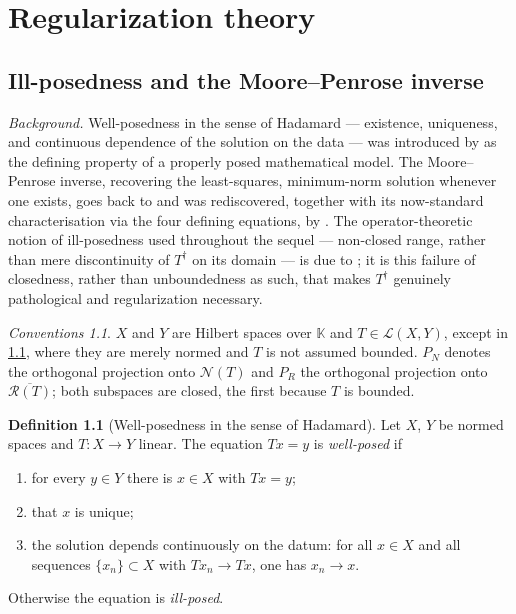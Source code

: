 \documentclass[a4paper]{report}
\theoremstyle{plain}
\theoremstyle{definition}
\newtheorem{definition}[theorem]{Definition}
\theoremstyle{remark}
\newtheorem{assumptions}[theorem]{Conventions}
\newcommand{\Ll}{\mathcal{L}}
\newcommand{\Ran}{\mathcal{R}}
\newcommand{\Ker}{\mathcal{N}}
\newcommand{\dg}{^{\dagger}}
\begin{document}
 \part{Regularization theory}
\label{part_2_reg}

\chapter{Ill-posedness and the Moore--Penrose inverse}
\label{ch_11_moore_penrose}

\noindent\emph{Background.} Well-posedness in the sense of Hadamard --- existence,
uniqueness, and continuous dependence of the solution on the data --- was introduced by
\citet{Hadamard1902} as the defining property of a properly posed mathematical model. The
Moore--Penrose inverse, recovering the least-squares, minimum-norm solution whenever one
exists, goes back to \citet{Moore1920} and was rediscovered, together with its
now-standard characterisation via the four defining equations, by \citet{Penrose1955}.
The operator-theoretic notion of ill-posedness used throughout the sequel --- non-closed
range, rather than mere discontinuity of $T\dg$ on its domain --- is due to
\citet{Nashed1987}; it is this failure of closedness, rather than unboundedness as such,
that makes $T\dg$ genuinely pathological and regularization necessary.

\begin{assumptions}
  \label{asm_ill_posedness_moore}
  $X$ and $Y$ are Hilbert spaces over $\mathbb{K}$ and
$T \in \Ll(X,Y)$, except in \cref{def_well_posed}, where they are merely normed and $T$
is not assumed bounded.  $P_N$ denotes the orthogonal projection
onto $\Ker(T)$ and $P_R$ the orthogonal projection onto $\overline{\Ran(T)}$; both
subspaces are closed, the first because $T$ is bounded.
\end{assumptions}

\begin{definition}[Well-posedness in the sense of Hadamard]
  \label{def_well_posed}
  Let $X$, $Y$ be normed spaces and $T \colon X \to Y$ linear.  The equation $Tx = y$ is
  \emph{well-posed} if
  \begin{enumerate}
    \item for every $y \in Y$ there is $x \in X$ with $Tx = y$;
    \item that $x$ is unique;
    \item the solution depends continuously on the datum: for all $x \in X$ and all
      sequences $\{x_n\} \subset X$ with $Tx_n \to Tx$, one has $x_n \to x$.
  \end{enumerate}
  Otherwise the equation is \emph{ill-posed}.
\end{definition}
\end{document}
